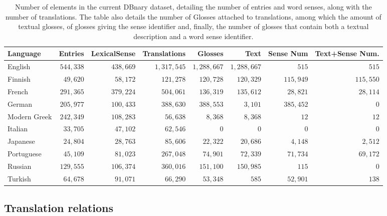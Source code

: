 \documentclass[10pt, a4paper]{article}
\begin{document}
\begin{table}[htb!]
\begin{center}\begin{footnotesize}
\begin{tabular}{lrrrrrrr}
\textbf{Language} & \textbf{Entries} & \textbf{LexicalSense} & \textbf{Translations} & \textbf{Glosses} & \textbf{Text} &  \textbf{Sense Num} & \textbf{Text+Sense Num.}\\
\hline
English & $544,338$ & $438,669$ & $1,317,545$ & $1,288,667$ & $1,288,667$ & $515$ & $515$ \\
Finnish & $49,620$ & $58,172$ & $121,278$ & $120,728$ & $120,329$ & $115,949$ & $115,550$ \\
French & $291,365$ & $379,224$ & $504,061$ & $136,319$ & $135,612$ & $28,821$ & $28,114$ \\
German & $205,977$ & $100,433$ & $388,630$ & $388,553$ & $3,101$ & $385,452$ & $0$ \\
Modern Greek & $242,349$ & $108,283$ & $56,638$ & $8,368$ & $8,368$ & $12$ & $12$ \\
Italian & $33,705$ & $47,102$ & $62,546$ & $0$ & $0$ & $0$ & $0$ \\
Japanese & $24,804$ & $28,763$ & $85,606$ & $22,322$ & $20,686$ & $4,148$ & $2,512$ \\
Portuguese & $45,109$ & $81,023$ & $267,048$ & $74,901$ & $72,339$ & $71,734$ & $69,172$ \\
Russian & $129,555$ & $106,374$ & $360,016$ & $151,100$ & $150,985$ & $115$ & $0$ \\
Turkish & $64,678$ & $91,071$ & $66,290$ & $53,348$ & $585$ & $52,901$ & $138$ \\
\hline
\end{tabular}
\caption{Number of elements in the current DBnary dataset, detailing the number of entries and word senses, along with the number of translations. The table also details the number of Glosses attached to translations, among which the amount of textual glosses, of glosses giving the sense identifier and, finally, the number of glosses that contain both a textual description and a word sense identifier.}
\label{lemon-elts}
\end{footnotesize}\end{center}
\end{table}

\subsection{Translation relations}
\end{document}
